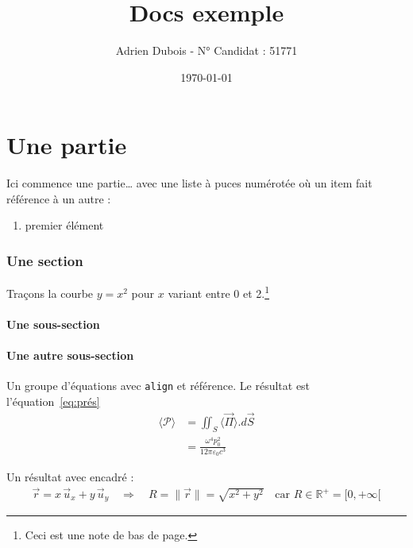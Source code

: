 \documentclass[a4paper, french, twoside]{article}
\title{Docs exemple}
\author{Adrien Dubois - N° Candidat : 51771}
\date{\today}
\begin{document}
\maketitle
\tableofcontents

\part{Une partie}
Ici commence une partie\dots{} avec une liste à puces numérotée où un item fait référence à un autre :
	\begin{enumerate}
	\item\label{it:point} premier élément
	\end{enumerate}

\section{Une section}
Traçons la courbe $y=x^2$ pour $x$ variant entre 0 et 2.\footnote{Ceci est une note de bas de page.}

\subsection{Une sous-section}

\subsection{Une autre sous-section}\label{sec:unereference}
Un groupe d'équations avec \texttt{align} et référence. Le résultat est l'équation~\eqref{eq:prés}
	\begin{align}
	\langle\mathcal{P}\rangle
	&=\iint_S\langle\vec{\Pi}\rangle.d\vec{S}\\
	&=\frac{\omega^4p_0^2}{12\pi\varepsilon_0c^3}\label{eq:prés}
	\end{align}

Un résultat avec encadré :
	\begin{align}
	\vec{r}=x\,\vec{u}_x+y\,\vec{u}_y
	\quad\Rightarrow\quad
	\boxed{
	R=\lVert\vec{r}\rVert=\sqrt{x^2+y^2}
	}
	\quad\text{car $R\in\mathbb{R}^+=[0,+\infty[$}
	\end{align}
\end{document}

